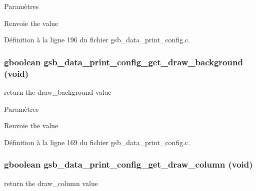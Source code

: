 \begin{DoxyParams}{Paramètres}
\item[{\em }]\end{DoxyParams}
\begin{DoxyReturn}{Renvoie}
the value 
\end{DoxyReturn}


Définition à la ligne 196 du fichier gsb\_\-data\_\-print\_\-config.c.

\subsubsection[{gsb\_\-data\_\-print\_\-config\_\-get\_\-draw\_\-background}]{\setlength{\rightskip}{0pt plus 5cm}gboolean gsb\_\-data\_\-print\_\-config\_\-get\_\-draw\_\-background (void)}\label{gsb__data__print__config_8h_aba43ee990b36315212df9e30ce5a640e}
return the draw\_\-background value


\begin{DoxyParams}{Paramètres}
\item[{\em }]\end{DoxyParams}
\begin{DoxyReturn}{Renvoie}
the value 
\end{DoxyReturn}


Définition à la ligne 169 du fichier gsb\_\-data\_\-print\_\-config.c.

\subsubsection[{gsb\_\-data\_\-print\_\-config\_\-get\_\-draw\_\-column}]{\setlength{\rightskip}{0pt plus 5cm}gboolean gsb\_\-data\_\-print\_\-config\_\-get\_\-draw\_\-column (void)}\label{gsb__data__print__config_8h_a9eee382b1ee81d2291ef4eb4aae4bb7a}
return the draw\_\-column value


